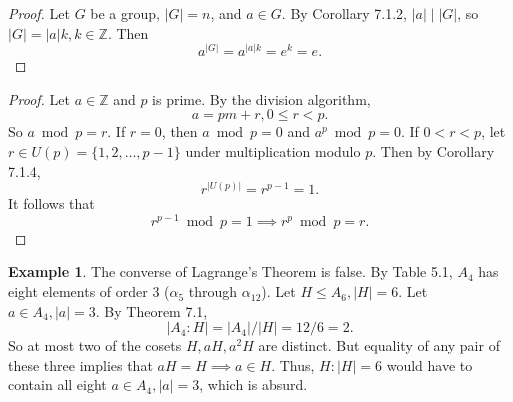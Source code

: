 \documentclass{article}
\newtheorem{corollary}{Corollary}[theorem]
\theoremstyle{definition}
\newtheorem{example}{Example}[section]
\begin{document}
     \noindent{}
     
     \begin{proof}
        Let $G$ be a group, $|G|=n$, and $a \in G$. By Corollary 7.1.2, $|a| \mid |G|$, so $|G| = |a|k, k \in \mathbb{Z}$. Then
        \begin{equation*}
            a^{|G|} = a^{|a|k} = e^k = e.
        \end{equation*}
     \end{proof}
     
     \noindent{}
     
     \begin{proof}
        Let $a \in \mathbb{Z}$ and $p$ is prime. By the division algorithm,
        \begin{equation*}
            a = pm + r, 0 \leq r < p.
        \end{equation*}
        So $a \bmod p = r$. If $r = 0$, then $a \bmod p = 0$ and $a^p \bmod p = 0$. If $0 < r < p$, let $r \in U(p) = \{1,2,\dots,p-1\}$ under multiplication modulo $p$. Then by Corollary 7.1.4, 
        \begin{equation*}
            r^{|U(p)|} = r^{p-1} = 1.
        \end{equation*}
        It follows that
        \begin{equation*}
            r^{p-1} \bmod p = 1 \implies r^p \bmod p = r.
        \end{equation*}
     \end{proof}
     
     \begin{example}
         The converse of Lagrange's Theorem is false. By Table 5.1, $A_4$ has eight elements of order 3 ($\alpha_5$ through $\alpha_{12}$). Let $H \leq A_6, |H| = 6$. Let $a \in A_4, |a| = 3$. By Theorem 7.1, 
         \begin{equation*}
            |A_4:H|=|A_4|/|H|=12/6=2.
         \end{equation*}
         So at most two of the cosets $H, aH, a^2H$ are distinct. But equality of any pair of these three implies that $aH = H \implies a \in H$. Thus, $H: |H|=6$ would have to contain all eight $a \in A_4, |a|=3$, which is absurd.
     \end{example}
     
\end{document}
